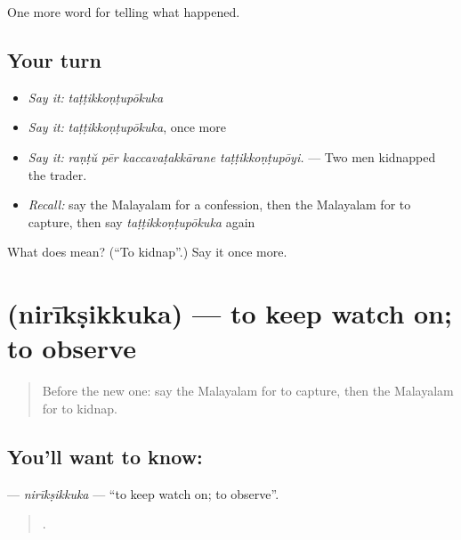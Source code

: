 \begin{grammarlens}[title={What you've built}]
One more word for telling what happened.
\end{grammarlens}

\subsection*{Your turn}
\begin{itemize}
\raggedright
  \item \emph{Say it:} \emph{taṭṭikkoṇṭupōkuka}
  \item \emph{Say it:} \emph{taṭṭikkoṇṭupōkuka}, once more
  \item \emph{Say it:} \emph{raṇṭŭ pēr kaccavaṭakkārane taṭṭikkoṇṭupōyi.} — Two men kidnapped the trader.
  \item \emph{Recall:} say the Malayalam for a confession, then the Malayalam for to capture, then say \emph{taṭṭikkoṇṭupōkuka} again
\end{itemize}

\begin{tcolorbox}[breakable,colback=teal!4,colframe=teal!35!black,title={Before you move on}]
What does  mean? (\textquotedblleft{}To kidnap\textquotedblright{}.) Say it once more.
\end{tcolorbox}
\section[\texorpdfstring{\ml{നിരീക്ഷിക്കുക} (nirīkṣikkuka)}{നിരീക്ഷിക്കുക (nirīkṣikkuka)}]{ (nirīkṣikkuka) — to keep watch on; to observe}

\label{lesson:ML-C367-niriksikkuka}



\begin{quote}
Before the new one: say the Malayalam for to capture, then the Malayalam for to kidnap.
\end{quote}

\subsection*{You'll want to know: }
\textbf{} — \emph{nirīkṣikkuka} — \textquotedblleft{}to keep watch on; to observe\textquotedblright{}.

\begin{quote}
    .
\end{quote}

